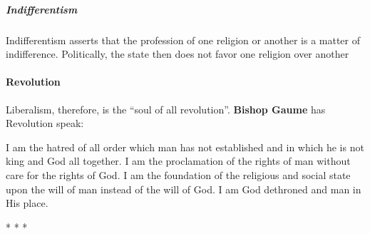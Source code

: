 \subparagraph{Indifferentism}


Indifferentism asserts that the profession of one religion or another is a matter of indifference. Politically, the state then does not favor one religion over another

\paragraph{Revolution}


Liberalism, therefore, is the ``soul of all revolution''. \textbf{Bishop Gaume} has Revolution speak:

\begin{quotex}
I am the hatred of all order which man has not established and in which he is not king and God all together. I am the proclamation of the rights of man without care for the rights of God. I am the foundation of the religious and social state upon the will of man instead of the will of God. I am God dethroned and man in His place.
\end{quotex}




\begin{center}* * *\end{center}


